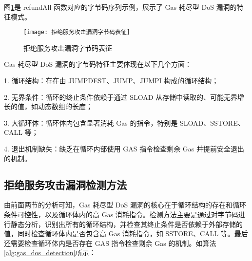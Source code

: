 \documentclass[print, master, vlined, timesmath]{DissertUESTC}
\begin{document}
图\ref{fig:拒绝服务攻击漏洞字节码表征}是 refundAll 函数对应的字节码序列示例，展示了 Gas 耗尽型 DoS 漏洞的特征模式。

\begin{figure}[htbp]
    \centering
    \texttt{[image: 拒绝服务攻击漏洞字节码表征]}
    \caption{拒绝服务攻击漏洞字节码表征}
    \label{fig:拒绝服务攻击漏洞字节码表征}
\end{figure}    

Gas 耗尽型 DoS 漏洞的字节码特征主要体现在以下几个方面：

1. 循环结构：存在由 JUMPDEST、JUMP、JUMPI 构成的循环结构；

2. 无界条件：循环的终止条件依赖于通过 SLOAD 从存储中读取的、可能无界增长的值，如动态数组的长度；

3. 大循环体：循环体内包含显著消耗 Gas 的指令，特别是 SLOAD、SSTORE、 CALL 等；

4. 退出机制缺失：缺乏在循环内部使用 GAS 指令检查剩余 Gas 并提前安全退出的机制。


\subsection{拒绝服务攻击漏洞检测方法}

由前面两节的分析可知，Gas 耗尽型 DoS 漏洞的核心在于循环结构的存在和循环条件可控性，以及循环体内的高 Gas 消耗指令。检测方法主要是通过对字节码进行静态分析，识别出所有的循环结构，并检查其终止条件是否依赖于外部存储的值，同时检查循环体内是否包含高 Gas 消耗指令，如 SSTORE、CALL 等。最后还需要检查循环体内是否存在 GAS 指令检查剩余 Gas 的机制。如算法\ref{alg:gas_dos_detection}所示：
\end{document}
